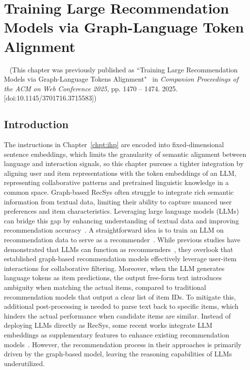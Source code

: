 
\chapter{Training Large Recommendation Models via Graph-Language Token Alignment}~\label{chpt:glta}
(This chapter was previously published as ``Training Large Recommendation Models via Graph-Language Tokens Alignment"~\cite{glta} in \textit{Companion Proceedings of the ACM on Web
Conference 2025}, pp. 1470 – 1474. 2025. [doi:10.1145/3701716.3715583])

\section{Introduction}
The instructions in Chapter~\ref{chpt:ihp} are encoded into fixed-dimensional sentence embeddings, which limits the granularity of semantic alignment between language and interaction signals, so this chapter pursues a tighter integration by aligning user and item representations with the token embeddings of an LLM, representing collaborative patterns and pretrained linguistic knowledge in a common space.
Graph-based RecSys often struggle to integrate rich semantic information from textual data, limiting their ability to capture nuanced user preferences and item characteristics. Leveraging large language models (LLMs) can bridge this gap by enhancing understanding of textual data and improving recommendation accuracy~\cite{rlmrec}.
A straightforward idea is to train an LLM on recommendation data to serve as a recommender~\cite{p5}.
While previous studies have demonstrated that LLMs can function as recommenders~\cite{cao-etal-2024-aligning}, they overlook that established graph-based recommendation models effectively leverage user-item interactions for collaborative filtering.
Moreover, when the LLM generates language tokens as item predictions, the output free-form text introduces ambiguity when matching the actual items, compared to traditional recommendation models that output a clear list of item IDs. 
To mitigate this, additional post-processing is needed to parse text back to specific items, which hinders the actual performance when candidate items are similar. 
Instead of deploying LLMs directly as RecSys, some recent works integrate LLM embeddings as supplementary features to enhance existing recommendation models~\cite{rlmrec,llmrec}. 
However, the recommendation process in their approaches is primarily driven by the graph-based model, leaving the reasoning capabilities of LLMs underutilized.

